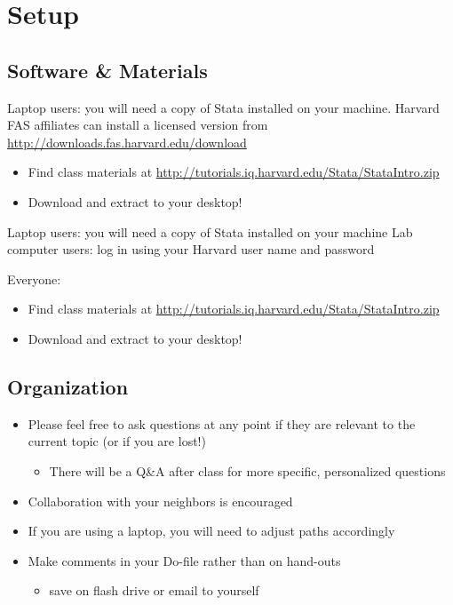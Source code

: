 \documentclass[]{book}
\providecommand{\tightlist}{%
  \setlength{\itemsep}{0pt}\setlength{\parskip}{0pt}}
\begin{document}
\section{Setup}\label{setup-6}

\subsection{Software \& Materials}\label{software-materials-6}

Laptop users: you will need a copy of Stata installed on your machine.
Harvard FAS affiliates can install a licensed version from
\url{http://downloads.fas.harvard.edu/download}

\begin{itemize}
\tightlist
\item
  Find class materials at
  \url{http://tutorials.iq.harvard.edu/Stata/StataIntro.zip}
\item
  Download and extract to your desktop!
\end{itemize}

Laptop users: you will need a copy of Stata installed on your machine
Lab computer users: log in using your Harvard user name and password

Everyone:

\begin{itemize}
\tightlist
\item
  Find class materials at
  \url{http://tutorials.iq.harvard.edu/Stata/StataIntro.zip}
\item
  Download and extract to your desktop!
\end{itemize}

\subsection{Organization}\label{organization}

\begin{itemize}
\tightlist
\item
  Please feel free to ask questions at any point if they are relevant to
  the current topic (or if you are lost!)

  \begin{itemize}
  \tightlist
  \item
    There will be a Q\&A after class for more specific, personalized
    questions
  \end{itemize}
\item
  Collaboration with your neighbors is encouraged
\item
  If you are using a laptop, you will need to adjust paths accordingly
\item
  Make comments in your Do-file rather than on hand-outs

  \begin{itemize}
  \tightlist
  \item
    save on flash drive or email to yourself
  \end{itemize}
\end{itemize}
\end{document}
